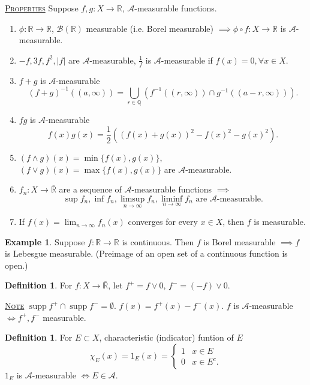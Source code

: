 \documentclass{report}
\newcommand{\R}{\mathbb{R}}
\newcommand{\Q}{\mathbb{Q}}
\def \supp {\operatorname{supp}}
\newcommand{\fancyem}[1]{\underline{\textsc{#1}}}
\theoremstyle{definition}
\newtheorem{definition}[theorem]{Definition}
\newtheorem{example}[theorem]{Example}
\theoremstyle{remark}
\begin{document}
\fancyem{Properties} Suppose $f, g: X \to \R$, $\mathcal{A}$-measurable functions.
\begin{enumerate}
	\item $\phi: \R \to \R$, $\mathcal{B}(\R)$ measurable (i.e. Borel measurable) $\implies \phi \circ f: X \to \R$ is $\mathcal{A}$-measurable.
	\item $-f, 3f, f^2, |f|$ are $\mathcal{A}$-measurable, $\frac{1}{f}$ is $\mathcal{A}$-measurable if $f(x) = 0, \forall x \in X$.
	\item $f + g$ is $\mathcal{A}$-measurable
	\[
		(f + g)^{-1}((a, \infty)) = \bigcup_{r \in \Q}\left(f^{-1}((r, \infty)) \cap g^{-1}((a-r,\infty))\right).
	\]
	\item $fg$ is $\mathcal{A}$-measurable \[
		f(x)g(x) = \frac{1}{2}\left((f(x)+g(x))^2 - f(x)^2 - g(x)^2\right).
	\]
	\item $(f \wedge g)(x) = \min\{f(x), g(x)\}$, $(f \vee g)(x) = \max\{f(x), g(x)\}$ are $\mathcal{A}$-measurable.
	\item $f_n: X \to \overline{\R}$ are a sequence of $\mathcal{A}$-measurable functions $\implies$
	\[
		\sup f_n, \inf f_n, \limsup_{n \to \infty} f_n, \liminf_{n \to \infty} f_n \text{ are $\mathcal{A}$-measurable.}
	\]
	\item If $f(x) = \lim_{n \to \infty}f_n(x)$ converges for every $x \in X$, then $f$ is measurable.
\end{enumerate}

\begin{example}
	Suppose $f: \R \to \R$ is continuous. Then $f$ is Borel measurable $\implies f$ is Lebesgue measurable. (Preimage of an open set of a continuous function is open.)
\end{example}
\begin{definition}
	For $f: X \to \overline{\R}$, let $f^+ = f \vee 0$, $f^- = (-f) \vee 0$.
\end{definition}
\fancyem{Note} $\supp f^+ \cap \supp f^- = \emptyset$.
$f(x) = f^+(x) - f^-(x)$. $f$ is $\mathcal{A}$-measurable $\iff f^+, f^-$ measurable.

\begin{definition}
	For $E \subset X$, characteristic (indicator) funtion of $E$
	\[
		\chi_E(x) = 1_E(x) = \begin{cases}
			1 & x \in E \\
			0 & x \in E^c.
		\end{cases}	
	\]
	$1_E$ is $\mathcal{A}$-measurable $\iff E \in \mathcal{A}$.
\end{definition}
\end{document}
